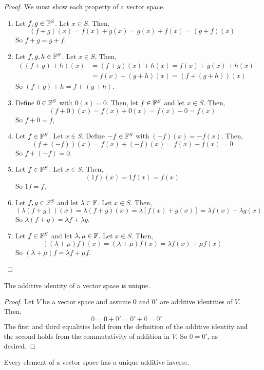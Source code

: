 \begin{proof}
    We must show each property of a vector space.
    \begin{enumerate}
        \item Let $f, g\in \mathbb F^S$. Let $x\in S$. Then, 
        \[ (f+g)(x) = f(x) + g(x) = g(x) + f(x) = (g+f)(x)\] 
        So $f+g = g+f$.
        \item Let $f,g,h\in \mathbb F^S$. Let $x\in S$. Then, 
        \begin{align*}
            ((f+g)+h)(x) &= (f+g)(x) + h(x) = f(x) + g(x) + h(x) \\
            &= f(x) + (g+h)(x) = (f+(g+h))(x)
        \end{align*}
        So $(f+g)+h = f+(g+h)$.
        \item Define $0\in \mathbb F^S$ with $0(x) = 0$. Then, let $f\in \mathbb F^S$ and let $x\in S$. Then,
        \[ (f+0)(x) = f(x) + 0(x) = f(x) + 0 = f(x)\]
        So $f+0 = f$,
        \item Let $f\in \mathbb F^S$. Let $x\in S$. Define $-f\in \mathbb F^S$ with $(-f)(x) = -f(x)$. Then,
        \[ (f + (-f))(x) = f(x) + (-f)(x) = f(x) - f(x) = 0\]
        So $f + (-f) = 0$.
        \item Let $f\in \mathbb F^S$. Let $x\in S$. Then, 
        \[ (1f)(x) = 1f(x) = f(x)\]
        So $1f = f$,
        \item Let $f,g\in \mathbb F^S$ and let $\lambda \in \mathbb F$. Let $x\in S$. Then,
        \[ (\lambda(f + g))(x) = \lambda(f+g)(x) = \lambda [f(x) + g(x)] = \lambda f(x) + \lambda g(x) \]
        So $\lambda(f+g) = \lambda f + \lambda g$.
        \item Let $f\in \mathbb F^S$ and let $\lambda, \mu\in \mathbb F$. Let $x\in S$. Then,
        \[ ((\lambda + \mu)f)(x) = (\lambda +\mu)f(x) = \lambda f(x) + \mu f(x)\]
        So $(\lambda + \mu)f = \lambda f + \mu f$.
    \end{enumerate}
\end{proof}
\begin{theorem}
    The additive identity of a vector space is unique.
\end{theorem}
\begin{proof}
    Let $V$ be a vector space and assume $0$ and $0'$ are additive identities of $V$. Then,
    \[ 0 = 0 + 0' = 0' + 0 = 0'\]
    The first and third equalities hold from the definition of the additive identity and the second holds from the commutativity of addition in $V$. So $0 = 0'$, as desired.
\end{proof}
\begin{theorem} \label{unique additive inverse}
    Every element of a vector space has a unique additive inverse.
\end{theorem}
